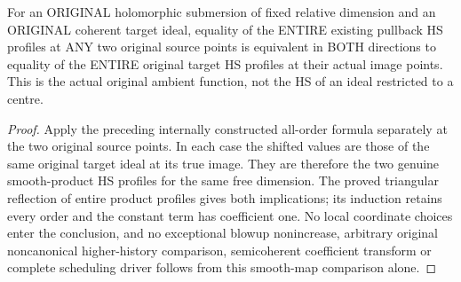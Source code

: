 \begin{theorem}
\label{hir:original-smooth-submersion-entire-intrinsic-hs-profile-reflection}
\leanok
For an ORIGINAL holomorphic submersion of fixed relative dimension and
an ORIGINAL coherent target ideal, equality of the ENTIRE existing
pullback HS profiles at ANY two original source points is equivalent
in BOTH directions to equality of the ENTIRE original target HS
profiles at their actual image points. This is the actual original
ambient function, not the HS of an ideal restricted to a centre.
\end{theorem}
\begin{proof}
Apply the preceding internally constructed all-order formula separately
at the two original source points. In each case the shifted values are
those of the same original target ideal at its true image. They are
therefore the two genuine smooth-product HS profiles for the same free
dimension. The proved triangular reflection of entire product profiles
gives both implications; its induction retains every order and the
constant term has coefficient one. No local coordinate choices enter
the conclusion, and no exceptional blowup nonincrease, arbitrary
original noncanonical higher-history comparison, semicoherent
coefficient transform or complete scheduling driver follows from this
smooth-map comparison alone.
\end{proof}
